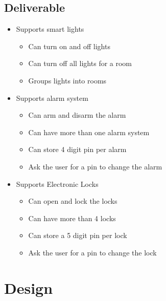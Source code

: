 \documentclass[11pt]{article}
\begin{document}
		\subsection{Deliverable}
			\begin{itemize}
				\item Supports smart lights
				\begin{itemize}
					\item Can turn on and off lights
					\item Can turn off all lights for a room
					\item Groups lights into rooms
				\end{itemize}
				\item Supports alarm system
				\begin{itemize}
					\item Can arm and disarm the alarm
					\item Can have more than one alarm system
					\item Can store 4 digit pin per alarm 
					\item Ask the user for a pin to change the alarm
				\end{itemize}
				\item Supports Electronic Locks
				\begin{itemize}
					\item Can open and lock the locks
					\item Can have more than 4 locks
					\item Can store a 5 digit pin per lock
					\item Ask the user for a pin to change the lock
				\end{itemize}
			\end{itemize}
	\section{Design}
\end{document}
